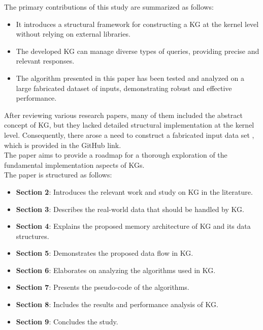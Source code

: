 \documentclass[conference]{IEEEtran}
\begin{document}
The primary contributions of this study are summarized as follows:

\begin{itemize}
    \item It introduces a structural framework for constructing a KG at the kernel level without relying on external libraries.
    \item The developed KG can manage diverse types of queries, providing precise and relevant responses.
    \item The algorithm presented in this paper has been tested and analyzed on a large fabricated dataset of inputs, demonstrating robust and effective performance.
\end{itemize}

After reviewing various research papers, many of them included the abstract concept of KG, but they lacked detailed structural implementation at the kernel level. 
Consequently, there arose a need to construct a fabricated input data set \cite{b11}, which is provided in the GitHub link.\\
The paper aims to provide a roadmap for a thorough exploration of the fundamental implementation aspects of KGs.
\\

The paper is structured as follows:

\begin{itemize}
    \item \textbf{Section 2}: Introduces the relevant work and study on KG in the literature.
    \item \textbf{Section 3}: Describes the real-world data that should be handled by KG.
    \item \textbf{Section 4}: Explains the proposed memory architecture of KG and its data structures.
    \item \textbf{Section 5}: Demonstrates the proposed data flow in KG.
    \item \textbf{Section 6}: Elaborates on analyzing the algorithms used in KG.
    \item \textbf{Section 7}: Presents the pseudo-code of the algorithms.
    \item \textbf{Section 8}: Includes the results and performance analysis of KG.
    \item \textbf{Section 9}: Concludes the study.
\end{itemize}
\end{document}
